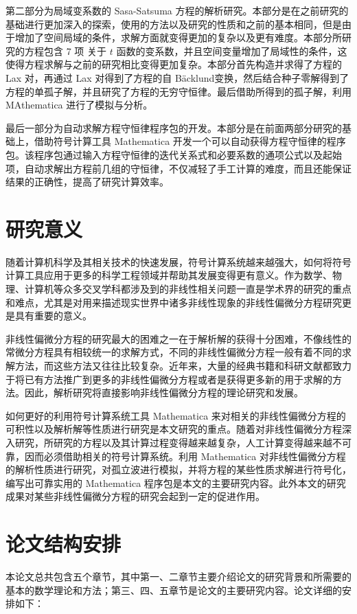 第二部分为局域变系数的 Sasa-Satsuma 方程的解析研究。本部分是在之前研究的基础进行更加深入的探索，使用的方法以及研究的性质和之前的基本相同，但是由于增加了空间局域的条件，求解方面就变得更加的复杂以及更有难度。本部分所研究的方程包含 7 项 关于 $t$ 函数的变系数，并且空间变量增加了局域性的条件，这使得方程求解与之前的研究相比变得更加复杂。本部分首先构造并求得了方程的 Lax 对，再通过 Lax 对得到了方程的自 B\"{a}cklund变换，然后结合种子零解得到了方程的单孤子解，并且研究了方程的无穷守恒律。最后借助所得到的孤子解，利用 MAthematica 进行了模拟与分析。

最后一部分为自动求解方程守恒律程序包的开发。本部分是在前面两部分研究的基础上，借助符号计算工具 Mathematica 开发一个可以自动获得方程守恒律的程序包。该程序包通过输入方程守恒律的迭代关系式和必要系数的通项公式以及起始项，自动求解出方程前几组的守恒律，不仅减轻了手工计算的难度，而且还能保证结果的正确性，提高了研究计算效率。

\section{研究意义}
随着计算机科学及其相关技术的快速发展，符号计算系统越来越强大，如何将符号计算工具应用于更多的科学工程领域并帮助其发展变得更有意义。作为数学、物理、计算机等众多交叉学科都涉及到的非线性相关问题一直是学术界的研究的重点和难点，尤其是对用来描述现实世界中诸多非线性现象的非线性偏微分方程研究更是具有重要的意义。

非线性偏微分方程的研究最大的困难之一在于解析解的获得十分困难，不像线性的常微分方程具有相较统一的求解方式，不同的非线性偏微分方程一般有着不同的求解方法，而这些方法又往往比较复杂。近年来，大量的经典书籍和科研文献都致力于将已有方法推广到更多的非线性偏微分方程或者是获得更多新的用于求解的方法。因此，解析研究将直接影响非线性偏微分方程的理论研究和发展。

如何更好的利用符号计算系统工具 Mathematica 来对相关的非线性偏微分方程的可积性以及解析解等性质进行研究是本文研究的重点。随着对非线性偏微分方程深入研究，所研究的方程以及其计算过程变得越来越复杂，人工计算变得越来越不可靠，因而必须借助相关的符号计算系统。利用 Mathematica 对非线性偏微分方程的解析性质进行研究，对孤立波进行模拟，并将方程的某些性质求解进行符号化，编写出可靠实用的 Mathematica 程序包是本文的主要研究内容。此外本文的研究成果对某些非线性偏微分方程的研究会起到一定的促进作用。

\section{论文结构安排}
本论文总共包含五个章节，其中第一、二章节主要介绍论文的研究背景和所需要的基本的数学理论和方法；第三、四、五章节是论文的主要研究内容。论文详细的安排如下：


